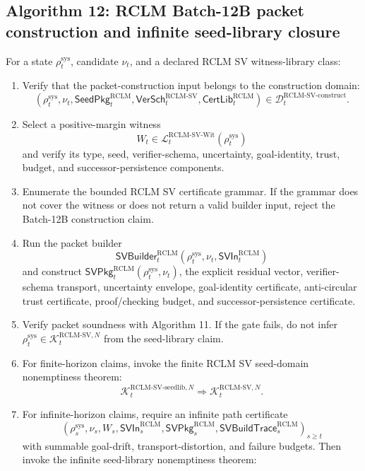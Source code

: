 \documentclass[11pt,a4paper]{article}
\newcommand{\Lcal}{\mathcal L}
\newcommand{\Kcal}{\mathcal K}
\newcommand{\Dcal}{\mathcal D}
\newcommand{\RCLM}{\mathrm{RCLM}}
\newcommand{\sys}{\mathrm{sys}}
\begin{document}
\subsection*{Algorithm 12: RCLM Batch-12B packet construction and infinite seed-library closure}
\label{alg:rclm-batch12b-packet-construction-infinite-closure}
For a state \(\rho_t^{\sys}\), candidate \(\nu_t\), and a declared RCLM SV witness-library class:
\begin{enumerate}[label=(\arabic*),leftmargin=1.5em]
    \item Verify that the packet-construction input belongs to the construction domain:
    \[
    (\rho_t^{\sys},\nu_t,\mathsf{SeedPkg}_t^{\RCLM},\mathsf{VerSch}_t^{\RCLM\text{-}\mathrm{SV}},\mathsf{CertLib}_t^{\RCLM})
    \in
    \Dcal_t^{\RCLM\text{-}\mathrm{SV\mbox{-}construct}}.
    \]
    \item Select a positive-margin witness
    \[
    W_t\in\Lcal_t^{\RCLM\text{-}\mathrm{SV\mbox{-}Wit}}(\rho_t^{\sys})
    \]
    and verify its type, seed, verifier-schema, uncertainty, goal-identity, trust, budget, and successor-persistence components.
    \item Enumerate the bounded RCLM SV certificate grammar.  If the grammar does not cover the witness or does not return a valid builder input, reject the Batch-12B construction claim.
    \item Run the packet builder
    \[
    \mathsf{SVBuilder}_t^{\RCLM}(\rho_t^{\sys},\nu_t,\mathsf{SVIn}_t^{\RCLM})
    \]
    and construct \(\mathsf{SVPkg}_t^{\RCLM}(\rho_t^{\sys},\nu_t)\), the explicit residual vector, verifier-schema transport, uncertainty envelope, goal-identity certificate, anti-circular trust certificate, proof/checking budget, and successor-persistence certificate.
    \item Verify packet soundness with Algorithm 11.  If the gate fails, do not infer \(\rho_t^{\sys}\in\Kcal_t^{\RCLM\text{-}\mathrm{SV},N}\) from the seed-library claim.
    \item For finite-horizon claims, invoke the finite RCLM SV seed-domain nonemptiness theorem:
    \[
    \Kcal_t^{\RCLM\text{-}\mathrm{SV\mbox{-}seedlib},N}
    \Rightarrow
    \Kcal_t^{\RCLM\text{-}\mathrm{SV},N}.
    \]
    \item For infinite-horizon claims, require an infinite path certificate
    \[
    (\rho_s^{\sys},\nu_s,W_s,\mathsf{SVIn}_s^{\RCLM},\mathsf{SVPkg}_s^{\RCLM},\mathsf{SVBuildTrace}_s^{\RCLM})_{s\ge t}
    \]
    with summable goal-drift, transport-distortion, and failure budgets.  Then invoke the infinite seed-library nonemptiness theorem:

\end{enumerate}
\end{document}
